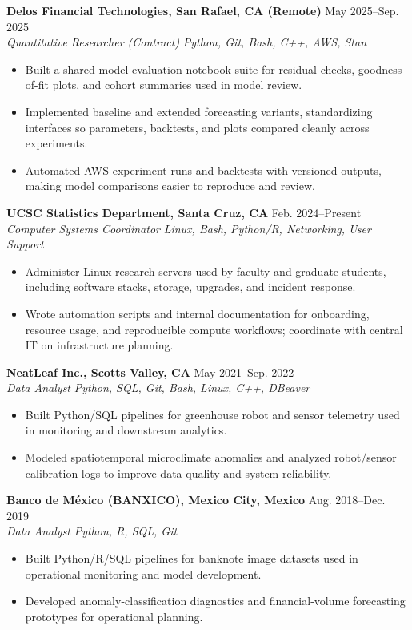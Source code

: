 \documentclass[10pt,letterpaper]{article}
\newcommand{\entry}[4]{%
  \Needspace{6\baselineskip}%
  \textbf{#1} \hfill #2\\
  \textit{#3} \hfill \textit{#4}\\[-2pt]
}
\begin{document}
\entry{Delos Financial Technologies, San Rafael, CA (Remote)}{May 2025--Sep. 2025}{Quantitative Researcher (Contract)}{Python, Git, Bash, C++, AWS, Stan}
\begin{itemize}
  \item Built a shared model-evaluation notebook suite for residual checks, goodness-of-fit plots, and cohort summaries used in model review.
  \item Implemented baseline and extended forecasting variants, standardizing interfaces so parameters, backtests, and plots compared cleanly across experiments.
  \item Automated AWS experiment runs and backtests with versioned outputs, making model comparisons easier to reproduce and review.
\end{itemize}

\entry{UCSC Statistics Department, Santa Cruz, CA}{Feb. 2024--Present}{Computer Systems Coordinator}{Linux, Bash, Python/R, Networking, User Support}
\begin{itemize}
  \item Administer Linux research servers used by faculty and graduate students, including software stacks, storage, upgrades, and incident response.
  \item Wrote automation scripts and internal documentation for onboarding, resource usage, and reproducible compute workflows; coordinate with central IT on infrastructure planning.
\end{itemize}

\entry{NeatLeaf Inc., Scotts Valley, CA}{May 2021--Sep. 2022}{Data Analyst}{Python, SQL, Git, Bash, Linux, C++, DBeaver}
\begin{itemize}
  \item Built Python/SQL pipelines for greenhouse robot and sensor telemetry used in monitoring and downstream analytics.
  \item Modeled spatiotemporal microclimate anomalies and analyzed robot/sensor calibration logs to improve data quality and system reliability.
\end{itemize}

\entry{Banco de M\'exico (BANXICO), Mexico City, Mexico}{Aug. 2018--Dec. 2019}{Data Analyst}{Python, R, SQL, Git}
\begin{itemize}
  \item Built Python/R/SQL pipelines for banknote image datasets used in operational monitoring and model development.
  \item Developed anomaly-classification diagnostics and financial-volume forecasting prototypes for operational planning.
\end{itemize}
\end{document}
